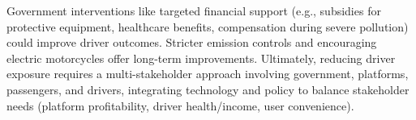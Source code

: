 
Government interventions like targeted financial support (e.g., subsidies for protective equipment, healthcare benefits, compensation during severe pollution) could improve driver outcomes.
Stricter emission controls and encouraging electric motorcycles offer long-term improvements.
Ultimately, reducing driver exposure requires a multi-stakeholder approach involving government, platforms, passengers, and drivers, integrating technology and policy to balance stakeholder needs (platform profitability, driver health/income, user convenience).

